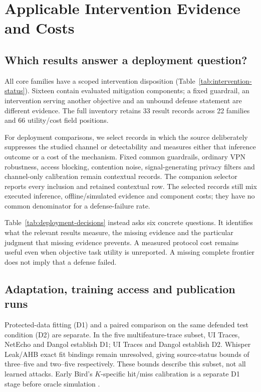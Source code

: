 \section{Applicable Intervention Evidence and Costs}\label{sec:defenses}
\subsection{Which results answer a deployment question?}
All \FinalCore{} core families have a scoped intervention disposition (Table~\ref{tab:intervention-status}). Sixteen contain evaluated mitigation components; a fixed guardrail, an intervention serving another objective and an unbound defense statement are different evidence. The full inventory retains 33 result records across 22 families and 66 utility/cost field positions.


For deployment comparisons, we select records in which the source deliberately suppresses the studied channel or detectability and measures either that inference outcome or a cost of the mechanism. Fixed common guardrails, ordinary VPN robustness, access blocking, contention noise, signal-generating privacy filters and channel-only calibration remain contextual records. The companion selector reports every inclusion and retained contextual row. The selected records still mix executed inference, offline/simulated evidence and component costs; they have no common denominator for a defense-failure rate.

Table~\ref{tab:deployment-decisions} instead asks six concrete questions. It identifies what the relevant results measure, the missing evidence and the particular judgment that missing evidence prevents. A measured protocol cost remains useful even when objective task utility is unreported. A missing complete frontier does not imply that a defense failed.


\subsection{Adaptation, training access and publication runs}
Protected-data fitting (D1) and a paired comparison on the same defended test condition (D2) are separate. In the five multifeature-trace subset, UI Traces, NetEcho and Dangol establish D1; UI Traces and Dangol establish D2. Whisper Leak/AHB exact fit bindings remain unresolved, giving source-status bounds of three--five and two--five respectively. These bounds describe this subset, not all learned attacks. Early Bird's $K$-specific hit/miss calibration is a separate D1 stage before oracle simulation \cite{earlybird2025}.

